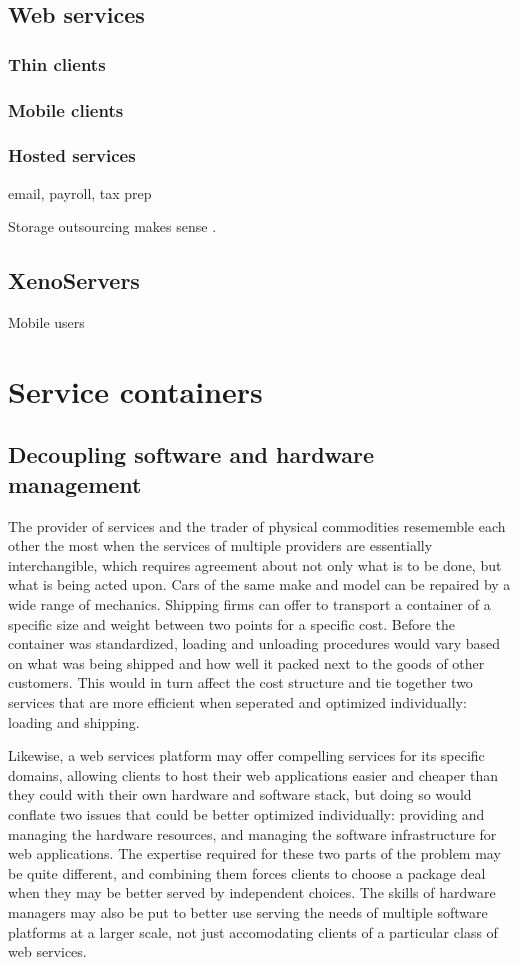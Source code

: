 \subsection{Web services}
\subsubsection{Thin clients}
\subsubsection{Mobile clients}
\subsubsection{Hosted services}
email, payroll, tax prep

Storage outsourcing makes sense \cite{ng}.

\subsection{XenoServers}

Mobile users \cite{demers}

\section{Service containers}

\subsection{Decoupling software and hardware management}

The provider of services and the trader of physical commodities resememble each other the most when the services of multiple providers are essentially interchangible, which requires agreement about not only what is to be done, but what is being acted upon. Cars of the same make and model can be repaired by a wide range of mechanics. Shipping firms can offer to transport a container of a specific size and weight between two points for a specific cost. Before the container was standardized, loading and unloading procedures would vary based on what was being shipped and how well it packed next to the goods of other customers. This would in turn affect the cost structure and tie together two services that are more efficient when seperated and optimized individually: loading and shipping.

Likewise, a web services platform may offer compelling services for its specific domains, allowing clients to host their web applications easier and cheaper than they could with their own hardware and software stack, but doing so would conflate two issues that could be better optimized individually: providing and managing the hardware resources, and managing the software infrastructure for web applications. The expertise required for these two parts of the problem may be quite different, and combining them forces clients to choose a package deal when they may be better served by independent choices. The skills of hardware managers may also be put to better use serving the needs of multiple software platforms at a larger scale, not just accomodating clients of a particular class of web services.

